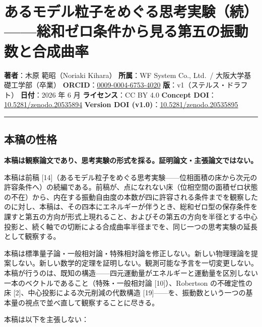 \documentclass[
]{ltjsarticle}
\author{}
\date{}
\begin{document}
\section{あるモデル粒子をめぐる思考実験（続）------総和ゼロ条件から見る第五の振動数と合成曲率}\label{ux3042ux308bux30e2ux30c7ux30ebux7c92ux5b50ux3092ux3081ux3050ux308bux601dux8003ux5b9fux9a13ux7d9aux7dcfux548cux30bcux30edux6761ux4ef6ux304bux3089ux898bux308bux7b2cux4e94ux306eux632fux52d5ux6570ux3068ux5408ux6210ux66f2ux7387}

\textbf{著者}：木原 範昭（Noriaki Kihara） \textbf{所属}：WF System Co.,
Ltd.~/ 大阪大学基礎工学部（卒業）
\textbf{ORCID}：\href{https://orcid.org/0009-0004-6753-4020}{0009-0004-6753-4020}
\textbf{版}：v1（ステルス・ドラフト） \textbf{日付}：2026 年 6 月
\textbf{ライセンス}：CC BY 4.0 \textbf{Concept
DOI}：\href{https://doi.org/10.5281/zenodo.20535894}{10.5281/zenodo.20535894}
\textbf{Version DOI
(v1.0)}：\href{https://doi.org/10.5281/zenodo.20535895}{10.5281/zenodo.20535895}

\begin{center}\rule{0.5\linewidth}{0.5pt}\end{center}

\subsection{本稿の性格}\label{ux672cux7a3fux306eux6027ux683c}

\textbf{本稿は観察論文であり、思考実験の形式を採る。証明論文・主張論文ではない。}

本稿は前稿
{[}14{]}（あるモデル粒子をめぐる思考実験------位相面積の床から次元の許容条件へ）の続編である。前稿が、点になれない床（位相空間の面積ゼロ状態の不在）から、内在する振動自由度の本数が四に許容される条件までを観察したのに対し、本稿は、その四本にエネルギーが伴うとき、総和ゼロ型の保存条件を課すと第五の方向が形式上現れること、およびその第五の方向を半径とする中心投影と、続く軸での切断による合成曲率半径までを、同じ一つの思考実験の延長として観察する。

本稿は標準量子論・一般相対論・特殊相対論を修正しない。新しい物理理論を提案しない。新しい数学的定理を証明しない。観測可能な予言を一切変更しない。本稿が行うのは、既知の構造------四元運動量がエネルギーと運動量を区別しない一本のベクトルであること（特殊・一般相対論
{[}10{]}）、Robertson の不確定性の床
{[}2{]}、中心投影による次元削減の代数構造
{[}19{]}------を、振動数という一つの基本量の視点で並べ直して観察することに尽きる。

本稿は以下を主張しない：
\end{document}

